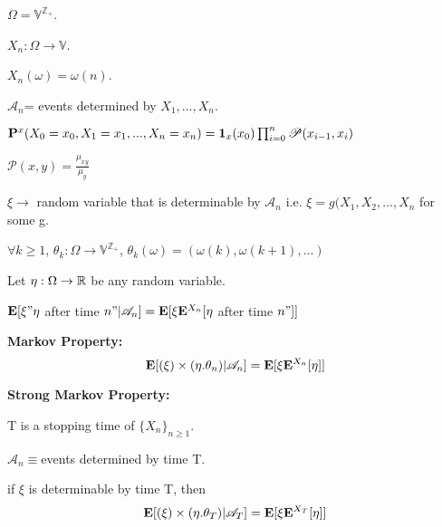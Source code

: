 \documentclass[main]{subfiles}
\begin{document}
$\Omega=\mathbb{V}^{\mathbb{Z_+}}$.

$X_n: \Omega \rightarrow \mathbb{V}$.

$X_n(\omega)= \omega(n)$.

$\mathscr{A}_n$= events determined by $X_1, ..., X_n$.

$\mathbf P^x(X_0=x_0, X_1=x_1,..., X_n=x_n)= \mathbf{1}_{x}(x_0)\prod_{i=0}^n \mathscr{P}(x_{i-1}, x_i)$

$\mathscr{P}(x,y)=\frac{\mu_{xy}}{\mu_y}$

$\xi \rightarrow$ random variable that is determinable by $\mathscr{A}_n$ i.e. $\xi=g(X_1, X_2,..., X_n$ for some g.

$\forall k \geq 1$, $\theta_k: \Omega \rightarrow \mathbb{V}^{\mathbb{Z_+}}$, $\theta_k(\omega)= (\omega(k), \omega(k+1),...)$

Let $\eta: \Omega \rightarrow \mathbb R$ be any random variable.

$\mathbf E[\xi"\eta$ after time $n"|\mathscr{A}_n]=\mathbf E[\xi\mathbf E^{X_n}[\eta$ after time $n"]]$

\textbf{Markov Property:}
\begin{equation}
     \mathbf E[(\xi)\times (\eta.\theta_n)|\mathscr{A}_n ]=\mathbf E[\xi\mathbf E^{X_n}[\eta]]
\end{equation}

\textbf{Strong Markov Property:}

T is a stopping time of $\{X_n\}_{n\geq 1}$.

$\mathscr{A}_n \equiv $events determined by time T.

if $\xi$ is determinable by time T, then
\begin{equation}
     \mathbf E[(\xi)\times (\eta.\theta_T)|\mathscr{A}_T ]=\mathbf E[\xi\mathbf E^{X_T}[\eta]]
\end{equation}
\end{document}
